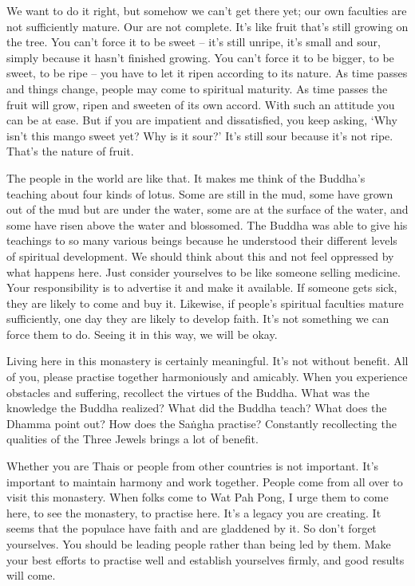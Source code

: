 We want to do it right, but somehow we can't get there yet; our own faculties are not sufficiently mature. Our  are not complete. It's like fruit that's still growing on the tree. You can't force it to be sweet -- it's still unripe, it's small and sour, simply because it hasn't finished growing. You can't force it to be bigger, to be sweet, to be ripe -- you have to let it ripen according to its nature. As time passes and things change, people may come to spiritual maturity. As time passes the fruit will grow, ripen and sweeten of its own accord. With such an attitude you can be at ease. But if you are impatient and dissatisfied, you keep asking, `Why isn't this mango sweet yet? Why is it sour?' It's still sour because it's not ripe. That's the nature of fruit.

The people in the world are like that. It makes me think of the Buddha's teaching about four kinds of lotus. Some are still in the mud, some have grown out of the mud but are under the water, some are at the surface of the water, and some have risen above the water and blossomed. The Buddha was able to give his teachings to so many various beings because he understood their different levels of spiritual development. We should think about this and not feel oppressed by what happens here. Just consider yourselves to be like someone selling medicine. Your responsibility is to advertise it and make it available. If someone gets sick, they are likely to come and buy it. Likewise, if people's spiritual faculties mature sufficiently, one day they are likely to develop faith. It's not something we can force them to do. Seeing it in this way, we will be okay.

Living here in this monastery is certainly meaningful. It's not without benefit. All of you, please practise together harmoniously and amicably. When you experience obstacles and suffering, recollect the virtues of the Buddha. What was the knowledge the Buddha realized? What did the Buddha teach? What does the Dhamma point out? How does the Sa\.ngha practise? Constantly recollecting the qualities of the Three Jewels brings a lot of benefit.

Whether you are Thais or people from other countries is not important. It's important to maintain harmony and work together. People come from all over to visit this monastery. When folks come to Wat Pah Pong, I urge them to come here, to see the monastery, to practise here. It's a legacy you are creating. It seems that the populace have faith and are gladdened by it. So don't forget yourselves. You should be leading people rather than being led by them. Make your best efforts to practise well and establish yourselves firmly, and good results will come.


